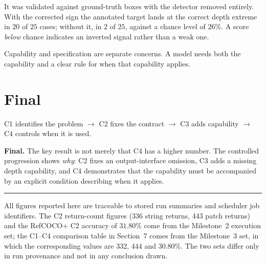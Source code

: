 \documentclass[11pt,a4paper]{article}
\begin{document}
\begin{description}[leftmargin=0pt, style=unboxed, itemsep=7pt]
\item[\textbf{How do you know the depth signal is correct?}]
It was validated against ground-truth boxes with the detector removed entirely. With
the corrected sign the annotated target lands at the correct depth extreme in $20$ of
$25$ cases; without it, in $2$ of $25$, against a chance level of $26\%$. A score
\emph{below} chance indicates an inverted signal rather than a weak one.

\item[\textbf{What is your strongest conclusion?}]
Capability and specification are separate concerns. A model needs both the capability
and a clear rule for when that capability applies.

\end{description}

\section{Final}

\begin{center}
\end{center}

\begin{center}\small
C1 identifies the problem $\rightarrow$ C2 fixes the contract $\rightarrow$
C3 adds capability $\rightarrow$ C4 controls when it is used.
\end{center}

\begin{finding}
\textbf{Final.} The key result is not merely that C4 has a higher number. The
controlled progression shows \emph{why}: C2 fixes an output-interface omission, C3 adds
a missing depth capability, and C4 demonstrates that the capability must be accompanied
by an explicit condition describing when it applies.
\end{finding}

\vspace{10pt}
\hrule
\vspace{4pt}
{\footnotesize\color{midgrey}
All figures reported here are traceable to stored run summaries and scheduler job
identifiers. The C2 return-count figures (336 string returns, 443 patch returns) and
the RefCOCO+ C2 accuracy of $31.80\%$ come from the Milestone~2 execution set; the
C1--C4 comparison table in Section~7 comes from the Milestone~3 set, in which the
corresponding values are 332, 444 and $30.80\%$. The two sets differ only in run
provenance and not in any conclusion drawn.}
\end{document}
